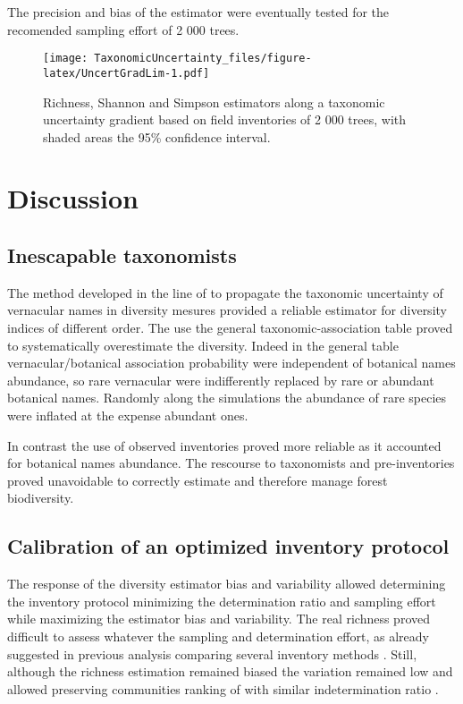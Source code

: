 \documentclass[fleqn,10pt]{ArtEcoFoG} %
\begin{document}
The precision and bias of the estimator were eventually tested for the
recomended sampling effort of 2 000 trees.

\begin{figure}
\centering
\texttt{[image: TaxonomicUncertainty\_files/figure-latex/UncertGradLim-1.pdf]}
\caption{\label{fig:UncertGradLim}Richness, Shannon and Simpson estimators
along a taxonomic uncertainty gradient based on field inventories of 2
000 trees, with shaded areas the 95\% confidence interval.}
\end{figure}

\section{Discussion}\label{discussion}

\subsection{Inescapable taxonomists}\label{inescapable-taxonomists}

The method developed in the line of \citet{Guitet2014b} to propagate the
taxonomic uncertainty of vernacular names in diversity mesures provided
a reliable estimator for diversity indices of different order. The use
the general taxonomic-association table proved to systematically
overestimate the diversity. Indeed in the general table
vernacular/botanical association probability were independent of
botanical names abundance, so rare vernacular were indifferently
replaced by rare or abundant botanical names. Randomly along the
simulations the abundance of rare species were inflated at the expense
abundant ones.

In contrast the use of observed inventories proved more reliable as it
accounted for botanical names abundance. The rescourse to taxonomists
and pre-inventories proved unavoidable to correctly estimate and
therefore manage forest biodiversity.

\subsection{Calibration of an optimized inventory
protocol}\label{calibration-of-an-optimized-inventory-protocol}

The response of the diversity estimator bias and variability allowed
determining the inventory protocol minimizing the determination ratio
and sampling effort while maximizing the estimator bias and variability.
The real richness proved difficult to assess whatever the sampling and
determination effort, as already suggested in previous analysis
comparing several inventory methods \citep{Higgins2004}. Still, although
the richness estimation remained biased the variation remained low and
allowed preserving communities ranking of with similar indetermination
ratio \citep{Vellend2008}.
\end{document}
